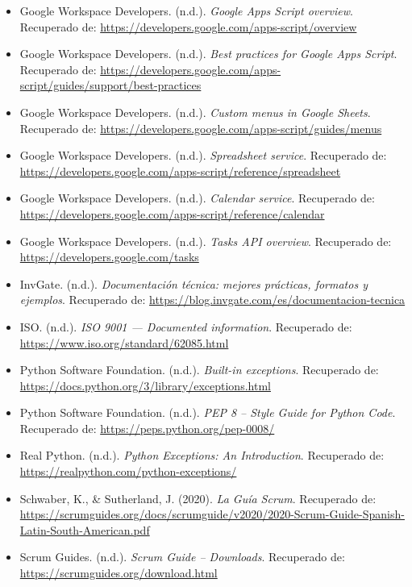 \documentclass[12pt]{article}
\begin{document}
\begin{itemize}
    \item Google Workspace Developers. (n.d.). \textit{Google Apps Script overview}.  
    Recuperado de: \url{https://developers.google.com/apps-script/overview}

    \item Google Workspace Developers. (n.d.). \textit{Best practices for Google Apps Script}.  
    Recuperado de: \url{https://developers.google.com/apps-script/guides/support/best-practices}

    \item Google Workspace Developers. (n.d.). \textit{Custom menus in Google Sheets}.  
    Recuperado de: \url{https://developers.google.com/apps-script/guides/menus}

    \item Google Workspace Developers. (n.d.). \textit{Spreadsheet service}.  
    Recuperado de: \url{https://developers.google.com/apps-script/reference/spreadsheet}

    \item Google Workspace Developers. (n.d.). \textit{Calendar service}.  
    Recuperado de: \url{https://developers.google.com/apps-script/reference/calendar}

    \item Google Workspace Developers. (n.d.). \textit{Tasks API overview}.  
    Recuperado de: \url{https://developers.google.com/tasks}

    \item InvGate. (n.d.). \textit{Documentación técnica: mejores prácticas, formatos y ejemplos}.  
    Recuperado de: \url{https://blog.invgate.com/es/documentacion-tecnica}

    \item ISO. (n.d.). \textit{ISO 9001 — Documented information}.  
    Recuperado de: \url{https://www.iso.org/standard/62085.html}

    \item Python Software Foundation. (n.d.). \textit{Built-in exceptions}.  
    Recuperado de: \url{https://docs.python.org/3/library/exceptions.html}

    \item Python Software Foundation. (n.d.). \textit{PEP 8 -- Style Guide for Python Code}.  
    Recuperado de: \url{https://peps.python.org/pep-0008/}

    \item Real Python. (n.d.). \textit{Python Exceptions: An Introduction}.  
    Recuperado de: \url{https://realpython.com/python-exceptions/}

    \item Schwaber, K., \& Sutherland, J. (2020). \textit{La Guía Scrum}.  
    Recuperado de: \url{https://scrumguides.org/docs/scrumguide/v2020/2020-Scrum-Guide-Spanish-Latin-South-American.pdf}

    \item Scrum Guides. (n.d.). \textit{Scrum Guide – Downloads}.  
    Recuperado de: \url{https://scrumguides.org/download.html}

\end{itemize}
\end{document}
